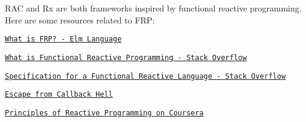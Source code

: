 R\+AC and Rx are both frameworks inspired by functional reactive programming. Here are some resources related to F\+RP\+:


\begin{DoxyItemize}
\item \href{http://elm-lang.org/learn/What-is-FRP.elm}{\tt What is F\+RP? -\/ Elm Language}
\item \href{http://stackoverflow.com/questions/1028250/what-is-functional-reactive-programming/1030631#1030631}{\tt What is Functional Reactive Programming -\/ Stack Overflow}
\item \href{http://stackoverflow.com/questions/5875929/specification-for-a-functional-reactive-programming-language#5878525}{\tt Specification for a Functional Reactive Language -\/ Stack Overflow}
\item \href{http://elm-lang.org/learn/Escape-from-Callback-Hell.elm}{\tt Escape from Callback Hell}
\item \href{https://www.coursera.org/course/reactive}{\tt Principles of Reactive Programming on Coursera} 
\end{DoxyItemize}